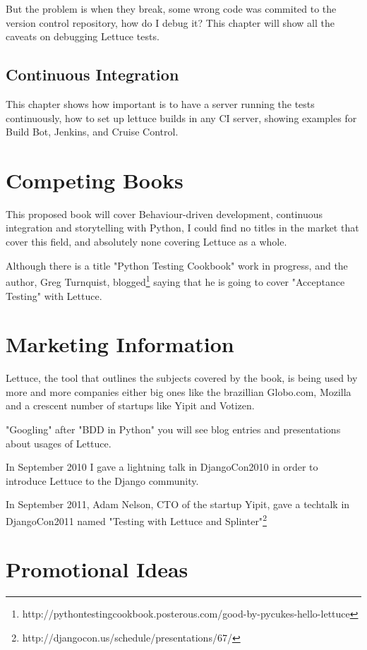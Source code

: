 \documentclass[letterpaper]{article}
\begin{document}
But the problem is when they break, some wrong code was commited to
the version control repository, how do I debug it?
This chapter will show all the caveats on debugging Lettuce tests.

\subsection*{Continuous Integration}
This chapter shows how important is to have a server running the tests
continuously, how to set up lettuce builds in any CI server, showing
examples for Build Bot, Jenkins, and Cruise Control.

\section*{Competing Books }
This proposed book will cover Behaviour-driven development, continuous
integration and storytelling with Python, I could find no titles in
the market that cover this field, and absolutely none covering
Lettuce as a whole.

Although there is a title "Python Testing Cookbook" work in progress,
and the author, Greg Turnquist, blogged\footnote{http://pythontestingcookbook.posterous.com/good-by-pycukes-hello-lettuce} saying that he is going to cover
"Acceptance Testing" with Lettuce.

\section*{Marketing Information}

Lettuce, the tool that outlines the subjects covered by the book, is
being used by more and more companies either big ones like the
brazillian Globo.com, Mozilla and a crescent number of startups like
Yipit and Votizen.

"Googling" after "BDD in Python" you will see blog entries and
presentations about usages of Lettuce.

In September 2010 I gave a lightning talk in DjangoCon2010 in order to
introduce Lettuce to the Django community.

In September 2011, Adam Nelson, CTO of the startup Yipit, gave a
techtalk in DjangoCon2011 named "Testing with Lettuce and
Splinter"\footnote{http://djangocon.us/schedule/presentations/67/}

\section*{Promotional Ideas}
\end{document}
